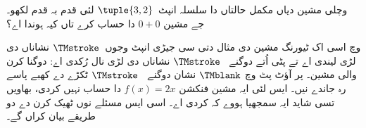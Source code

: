\documentclass[../../../include/open-logic-section]{subfiles}
\begin{document}
\begin{prob}
وچلی مشین دیاں مکمل
حالتاں دا سلسلہ
انپٹ~$\tuple{3,2}$ لئی
قدم بہ قدم لکھو۔ جے
مشین $0+0$ دا حساب
کرے تاں کیہ ہوندا اے؟
\end{prob}

\begin{explain}
وچ اسی اک ٹیورنگ مشین
دی مثال دتی سی جیڑی
انپٹ وجوں~$\TMstroke$
نشاناں دی لڑی لیندی
اے تے پٹی اُتے دوگنے
~$\TMstroke$ نشاناں دی
لڑی نال رُکدی اے:
دوگنا کرن والی مشین۔
پر آؤٹ پٹ وچ
$\TMblank$ نشان دوگنے
~$\TMstroke$ ٹکڑے دے
کھبے پاسے رہ جاندے
نیں۔ ایس لئی ایہ مشین
فنکشن $f(x) = 2x$ دا حساب
نہیں کردی، بھاویں تسی شاید
ایہ سمجھیا ہووے کہ کردی اے۔ اسی ایس
مسئلے نوں ٹھیک کرن دے
دو طریقے بیان کراں گے۔
\end{explain}
\end{document}
